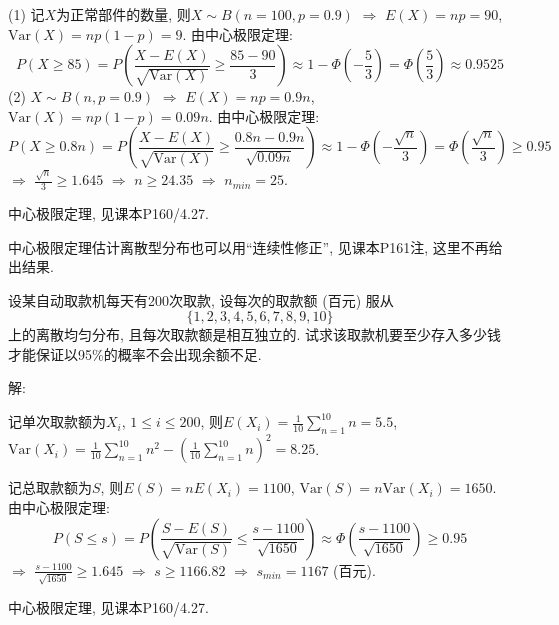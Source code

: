\documentclass[standard]{ExBook}
\renewenvironment{shaded}{%
  \def\FrameCommand{\fboxsep=\FrameSep \colorbox{shadecolor}}%
  \MakeFramed{\advance\hsize-\width \FrameRestore}%
}{%
  \endMakeFramed
}
\begin{document}
\begin{qitems}
(1) 记$X$为正常部件的数量, 则$X\sim B(n=100,p=0.9)$ $\Longrightarrow$ $E(X)=np=90$, $\mathrm{Var}(X)=np(1-p)=9$. 由中心极限定理:
$$\displaystyle P(X\geq 85)=P\left(\frac{X-E(X)}{\sqrt{\mathrm{Var}(X)}}\geq \frac{85-90}{3}\right) \approx 1-\Phi\left(-\frac{5}{3}\right) = \Phi\left(\frac{5}{3}\right) \approx 0.9525$$
(2) $X\sim B(n,p=0.9)$ $\Longrightarrow$ $E(X)=np=0.9n$, $\mathrm{Var}(X)=np(1-p)=0.09n$. 由中心极限定理:
$$P(X\geq 0.8n)=P\left(\frac{X-E(X)}{\sqrt{\mathrm{Var}(X)}}\geq \frac{0.8n-0.9n}{\sqrt{0.09n}}\right) \approx 1-\Phi\left(-\frac{\sqrt{n}}{3}\right) = \Phi\left(\frac{\sqrt{n}}{3}\right) \geq 0.95$$
$\Longrightarrow$ $\displaystyle\frac{\sqrt{n}}{3} \geq 1.645$ $\Longrightarrow$ $n\geq24.35$ $\Longrightarrow$ $n_{min}=25$.

\textcolor{themeColor}{\selectfont {} 中心极限定理, 见课本P160/4.27.}

\textcolor{themeColor}{\selectfont {} 中心极限定理估计离散型分布也可以用``连续性修正'', 见课本P161注, 这里不再给出结果.}

\vspace{2.5cm-5em}

    \begin{bbox}
    \begin{shaded}
        \qitem
设某自动取款机每天有200次取款, 设每次的取款额 (百元) 服从
$$\{1,2,3,4,5,6,7,8,9,10\}$$
上的离散均匀分布, 且每次取款额是相互独立的. 试求该取款机要至少存入多少钱才能保证以95\%的概率不会出现余额不足.
    \end{shaded}
    \end{bbox}

\vspace{\dimexpr2.5cm-5em\relax}

解: 

记单次取款额为$X_i$, $1\leq i\leq 200$, 则$\displaystyle E(X_i)=\frac{1}{10}\sum\limits_{n=1}^{10}n=5.5$, $\displaystyle \mathrm{Var}(X_i)=\frac{1}{10}\sum\limits_{n=1}^{10}n^2-\left(\frac{1}{10}\sum\limits_{n=1}^{10}n\right)^2=8.25$.

记总取款额为$S$, 则$E(S)=nE(X_i)=1100$, $\mathrm{Var}(S)=n\mathrm{Var}(X_i)=1650$. 由中心极限定理:
$$\displaystyle P(S\leq s)=P\left(\frac{S-E(S)}{\sqrt{\mathrm{Var}(S)}} \leq \frac{s-1100}{\sqrt{1650}}\right) \approx \Phi\left(\frac{s-1100}{\sqrt{1650}}\right) \geq 0.95$$
$\Longrightarrow$ $\displaystyle\frac{s-1100}{\sqrt{1650}} \geq 1.645$ $\Longrightarrow$ $s\geq 1166.82$ $\Longrightarrow$ $s_{min}=1167$ (百元).

\textcolor{themeColor}{\selectfont {} 中心极限定理, 见课本P160/4.27.}


\end{qitems}
\end{document}
